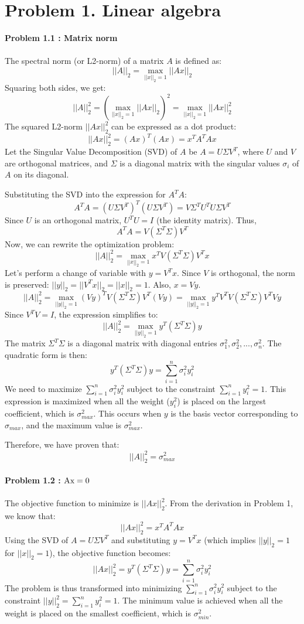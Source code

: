 \section*{Problem 1. Linear algebra}

\noindent\textbf{Problem 1.1 : Matrix norm} \\
\\
The spectral norm (or L2-norm) of a matrix $A$ is defined as:
$$ ||A||_2 = \max_{||x||_2=1} ||Ax||_2 $$
Squaring both sides, we get:
$$ ||A||_2^2 = \left(\max_{||x||_2=1} ||Ax||_2\right)^2 = \max_{||x||_2=1} ||Ax||_2^2 $$
The squared L2-norm $||Ax||_2^2$ can be expressed as a dot product:
$$ ||Ax||_2^2 = (Ax)^T(Ax) = x^T A^T A x $$
Let the Singular Value Decomposition (SVD) of $A$ be $A = U\Sigma V^T$, where $U$ and $V$ are orthogonal matrices, and $\Sigma$ is a diagonal matrix with the singular values $\sigma_i$ of $A$ on its diagonal.

Substituting the SVD into the expression for $A^T A$:
$$ A^T A = (U\Sigma V^T)^T(U\Sigma V^T) = V\Sigma^T U^T U\Sigma V^T $$
Since $U$ is an orthogonal matrix, $U^T U = I$ (the identity matrix). Thus,
$$ A^T A = V(\Sigma^T \Sigma)V^T $$
Now, we can rewrite the optimization problem:
$$ ||A||_2^2 = \max_{||x||_2=1} x^T V(\Sigma^T \Sigma)V^T x $$
Let's perform a change of variable with $y = V^T x$. Since $V$ is orthogonal, the norm is preserved: $||y||_2 = ||V^T x||_2 = ||x||_2 = 1$. Also, $x = Vy$.
$$ ||A||_2^2 = \max_{||y||_2=1} (Vy)^T V(\Sigma^T \Sigma)V^T (Vy) = \max_{||y||_2=1} y^T V^T V(\Sigma^T \Sigma)V^T V y $$
Since $V^T V = I$, the expression simplifies to:
$$ ||A||_2^2 = \max_{||y||_2=1} y^T (\Sigma^T \Sigma) y $$
The matrix $\Sigma^T \Sigma$ is a diagonal matrix with diagonal entries $\sigma_1^2, \sigma_2^2, ..., \sigma_n^2$. The quadratic form is then:
$$ y^T (\Sigma^T \Sigma) y = \sum_{i=1}^{n} \sigma_i^2 y_i^2 $$
We need to maximize $\sum_{i=1}^{n} \sigma_i^2 y_i^2$ subject to the constraint $\sum_{i=1}^{n} y_i^2 = 1$. This expression is maximized when all the weight ($y_i^2$) is placed on the largest coefficient, which is $\sigma_{max}^2$. This occurs when $y$ is the basis vector corresponding to $\sigma_{max}$, and the maximum value is $\sigma_{max}^2$.

Therefore, we have proven that:
$$ ||A||_2^2 = \sigma_{max}^2 $$
\\
\noindent\textbf{Problem 1.2 : $\rm{A} \rm{x} = 0$} \\
\\
The objective function to minimize is $||Ax||_2^2$. From the derivation in Problem 1, we know that:
$$ ||Ax||_2^2 = x^T A^T A x $$
Using the SVD of $A = U\Sigma V^T$ and substituting $y = V^T x$ (which implies $||y||_2=1$ for $||x||_2=1$), the objective function becomes:
$$ ||Ax||_2^2 = y^T (\Sigma^T \Sigma) y = \sum_{i=1}^{n} \sigma_i^2 y_i^2 $$
The problem is thus transformed into minimizing $\sum_{i=1}^{n} \sigma_i^2 y_i^2$ subject to the constraint $||y||_2^2 = \sum_{i=1}^{n} y_i^2 = 1$. The minimum value is achieved when all the weight is placed on the smallest coefficient, which is $\sigma_{min}^2$.

